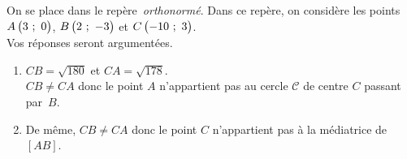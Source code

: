 \newpage

\begin{minipage}{0.45\textwidth}
\thispagestyle{vide}

\vspace*{1em}

\exercice
On se place dans le repère~\emph{orthonormé}. Dans ce repère, on considère les points $A\begin{pmatrix}3~;~0\end{pmatrix}$, $B\begin{pmatrix}2~;~-3\end{pmatrix}$ et $C\begin{pmatrix}-10~;~3\end{pmatrix}$.\\Vos réponses seront argumentées.

	\begin{enumerate}
		\item $CB = \sqrt{180}$ et $CA = \sqrt{178}$.\\
				$CB \neq CA$ donc le point $A$ n'appartient pas au cercle $\mathscr{C}$ de centre $C$ passant par~$B$.
		\item De même, $CB \neq CA$ donc le point $C$ n'appartient pas à la médiatrice de $\left[AB\right]$.
	\end{enumerate}

\end{minipage}

\newpage

